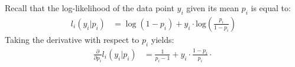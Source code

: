 \begin{frame}[fragile] \frametitle{}

Recall that the log-likelihood of the data point $y_i$ given its
mean $p_i$ is equal to:
\begin{align*}
l_i(y_i | p_i)
&= \log(1-p_i) + y_i \cdot \text{log} \left( \frac{p_i}{1 - p_i} \right)
\end{align*}
\pause Taking the derivative with respect to $p_i$ yields:
\begin{align*}
\frac{\partial}{\partial p_i} l_i(y_i | p_i)
&= \frac{1}{p_i - 1} + y_i \cdot \frac{1 - p_i}{p_i} \cdot \frac{}{}
\end{align*}

\end{frame}













